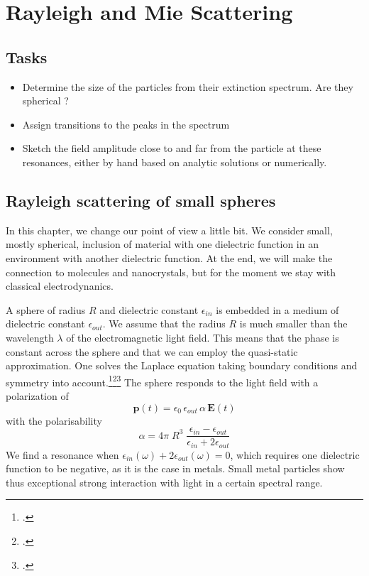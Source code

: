 

\chapter{Rayleigh and Mie Scattering}





\section{Tasks}

\begin{itemize}
\item Determine the size of the particles from their extinction spectrum. Are they spherical ?

\item Assign transitions to the peaks in the spectrum

\item Sketch the field amplitude close to and far from the particle at these resonances, either by hand based on analytic solutions or numerically.

\end{itemize}


\section{Rayleigh scattering of small spheres}


In this chapter, we change our point of view a little bit. We consider small, mostly spherical, inclusion of material with one dielectric function in an environment with another dielectric function. At the end, we will make the connection to molecules and nanocrystals, but for the moment we stay with classical electrodynanics.


A sphere of radius $R$ and dielectric constant $\epsilon_{in}$ is embedded in a medium of dielectric constant $\epsilon_{out}$. We assume that the radius $R$ is much smaller than the wavelength $\lambda$ of the electromagnetic light field. This means that the phase is constant across the sphere and that we can employ the quasi-static approximation. One solves the Laplace equation taking  boundary conditions and symmetry into account.\footcite{Jackson-ED}\footcite[excercise 2.4.2]{Nolting-ED}\footcite[chapter 5.2]{BH-book}
The sphere responds to the light field with a polarization of
\[
 \mathbf{p}(t) = \epsilon_0 \,  \epsilon_{out} \, \alpha \, \mathbf{E}(t)
\]
with the polarisability
\[
 \alpha = 4 \pi  \; R^3 \; \frac{\epsilon_{in} - \epsilon_{out}}{\epsilon_{in} + 2 \epsilon_{out}}
\]
We find a resonance when $\epsilon_{in}(\omega) + 2 \epsilon_{out}(\omega) = 0$, which requires one dielectric function to be negative, as it is the case in metals. Small metal particles show thus exceptional strong interaction with light in a certain spectral range.


